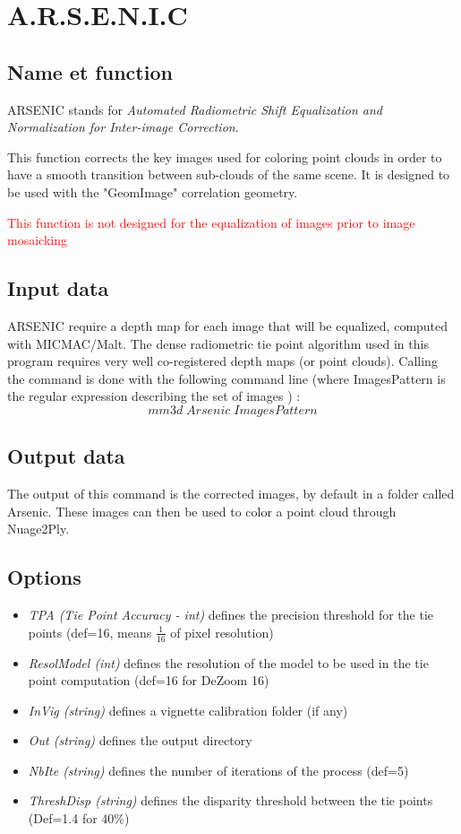 \section{A.R.S.E.N.I.C}
\label{A.R.S.E.N.I.C.}
\subsection{Name et function}
ARSENIC stands for \textit{Automated Radiometric Shift Equalization and Normalization for Inter-image Correction}.


This function corrects the key images used for coloring point clouds in order to have a smooth transition between sub-clouds of the same scene. It is designed to be used with the "GeomImage" correlation geometry. 


\textcolor{red}{ This function is not designed for the equalization of images prior to image mosaicking}

\subsection{Input data}
\label{inputArsenic}

ARSENIC require a depth map for each image that will be equalized, computed with MICMAC/Malt. The dense radiometric tie point algorithm used in this program requires very well co-registered depth maps (or point clouds).
Calling the command is done with the following command line (where ImagesPattern is the regular expression describing the set of images ) :\[mm3d\;Arsenic\;ImagesPattern\] 

\subsection{Output data}
The output of this command is the corrected images, by default in a folder called Arsenic. These images can then be used to color a point cloud through Nuage2Ply.

\subsection{Options}
\begin{itemize}
\item{\textit{TPA (Tie Point Accuracy - int)} defines the precision threshold for the tie points (def=16, means $\frac{1}{16}$ of pixel resolution)}
\item{\textit{ResolModel (int)} defines the resolution of the model to be used in the tie point computation (def=16 for DeZoom 16)}
\item{\textit{InVig (string)} defines a vignette calibration folder (if any)}
\item{\textit{Out (string)} defines the output directory}
\item{\textit{NbIte (string)} defines the number of iterations of the process (def=5)}
\item{\textit{ThreshDisp (string)} defines the disparity threshold between the tie points (Def=1.4 for 40\%)}
\end{itemize}

